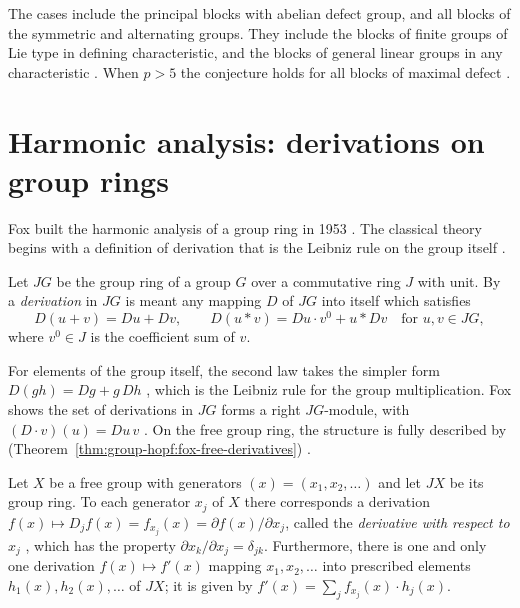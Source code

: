 The cases include the principal blocks with abelian defect group, and all
blocks of the symmetric and alternating groups. They include the blocks of
finite groups of Lie type in defining characteristic, and the blocks of
general linear groups in any characteristic
\cite[Theorem~B, p.~2]{AntrobusBriggsRubioDegrassi2026}.
When $p>5$ the conjecture holds for all blocks of maximal defect
\cite[Theorem~C, p.~3]{AntrobusBriggsRubioDegrassi2026}.

\section{Harmonic analysis: derivations on group rings}\label{sec:group-hopf:harmonic-analysis}

Fox built the harmonic analysis of a group ring in 1953 \cite{Fox1953}. The
classical theory begins with a definition of derivation that is the Leibniz
rule on the group itself
\cite[equations (1.1)--(1.2), p.~549]{Fox1953}.

\begin{definition}\label{def:group-hopf:fox-derivation}
Let $JG$ be the group ring of a group $G$ over a commutative ring $J$ with
unit. By a \emph{derivation} in $JG$ is meant any mapping $D$ of $JG$ into
itself which satisfies
\[
D(u+v)=Du+Dv,\qquad D(u\ast v)=Du\cdot v^{0}+u\ast Dv\quad\text{for }u,v\in JG,
\]
where $v^{0}\in J$ is the coefficient sum of $v$.
\end{definition}

For elements of the group itself, the second law takes the simpler form
$D(gh)=Dg+g\,Dh$ \cite[(1.2)', p.~549]{Fox1953}, which is the Leibniz rule for
the group multiplication. Fox shows the set of derivations in $JG$ forms a
right $JG$-module, with $(D\cdot v)(u)=Du\,v$ \cite[p.~549]{Fox1953}. On the
free group ring, the structure is fully described by (Theorem~\ref{thm:group-hopf:fox-free-derivatives}) \cite[Theorem, equations (2.1) and (2.2), p.~550]{Fox1953}.

\begin{theorem}\label{thm:group-hopf:fox-free-derivatives}
Let $X$ be a free group with generators $(x)=(x_1,x_2,\dots)$ and let $JX$ be
its group ring. To each generator $x_j$ of $X$ there corresponds a derivation
$f(x)\mapsto D_j f(x)=f_{x_j}(x)=\partial f(x)/\partial x_j$, called the
\emph{derivative with respect to} $x_j$ \cite[p.~550]{Fox1953}, which has the property
$\partial x_k/\partial x_j=\delta_{jk}$. Furthermore, there is one and only one
derivation $f(x)\mapsto f'(x)$ mapping $x_1,x_2,\ldots$ into prescribed
elements $h_1(x),h_2(x),\ldots$ of $JX$; it is given by
$f'(x)=\sum_j f_{x_j}(x)\cdot h_j(x)$.
\end{theorem}

